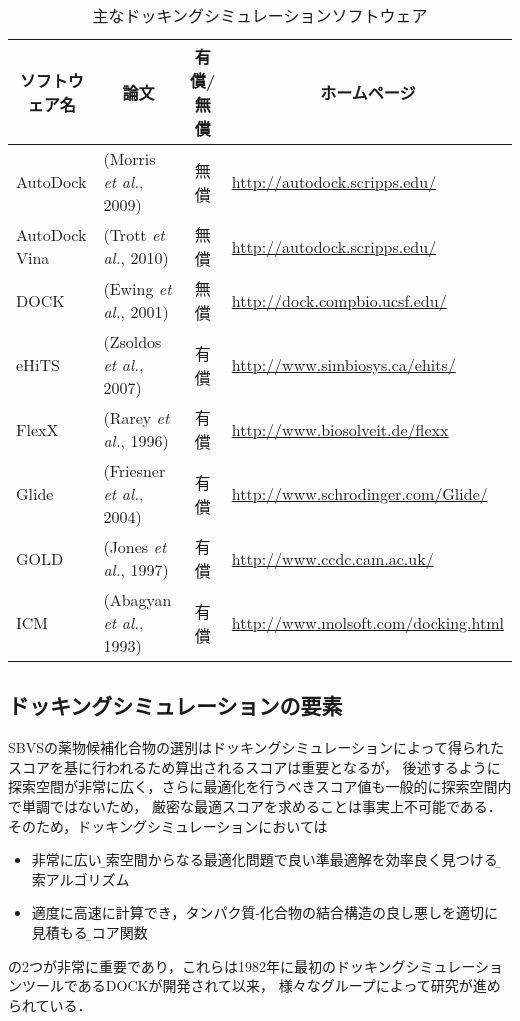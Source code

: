\begin{table}[htb] \centering
	\caption{主なドッキングシミュレーションソフトウェア}
	\label{table:docking_tools_eg}
	\begin{tabular}{llcl}
	\hline
	\multicolumn{1}{c}{ソフトウェア名}	&\multicolumn{1}{c}{論文}			&\multicolumn{1}{c}{有償/無償}	&\multicolumn{1}{c}{ホームページ}	\\ \hline
	AutoDock					&(Morris {\it et al.}, 2009)\cite{Morris2009}												&無償									&\url{http://autodock.scripps.edu/}	\\ 
	AutoDock Vina				&(Trott  {\it et al.}, 2010)\cite{Trott2010}																											&無償									&\url{http://autodock.scripps.edu/}	\\ 
	DOCK							&(Ewing {\it et al.}, 2001)\cite{Ewing2001}																				&無償									&\url{http://dock.compbio.ucsf.edu/}	\\
	eHiTS							&(Zsoldos {\it et al.}, 2007)\cite{Zsoldos2007}											&有償									&\url{http://www.simbiosys.ca/ehits/}	\\
	FlexX							&(Rarey {\it et al.}, 1996)\cite{Rarey1996}																											&有償									&\url{http://www.biosolveit.de/flexx}	\\
	Glide							&(Friesner {\it et al.}, 2004)\cite{Friesner2004}													&有償									&\url{http://www.schrodinger.com/Glide/}	\\
	GOLD							&(Jones {\it et al.}, 1997)\cite{Jones1997}																				&有償									&\url{http://www.ccdc.cam.ac.uk/}	\\
	ICM								&(Abagyan {\it et al.}, 1993)\cite{Abagyan1993}																											&有償									&\url{http://www.molsoft.com/docking.html}	\\ \hline
	\end{tabular}
\end{table}


\subsection{ドッキングシミュレーションの要素}\label{subsec:docking_elements}
SBVSの薬物候補化合物の選別はドッキングシミュレーションによって得られたスコアを基に行われるため算出されるスコアは重要となるが，
後述するように探索空間が非常に広く，さらに最適化を行うべきスコア値も一般的に探索空間内で単調ではないため，
厳密な最適スコアを求めることは事実上不可能である．そのため，ドッキングシミュレーションにおいては
\begin{itemize}
\item 非常に広い\b{探索空間}からなる最適化問題で良い準最適解を効率良く見つける\b{探索アルゴリズム}
\item 適度に高速に計算でき，タンパク質-化合物の結合構造の良し悪しを適切に見積もる\b{スコア関数}
\end{itemize}
の2つが非常に重要であり，これらは1982年に最初のドッキングシミュレーションツールであるDOCK\cite{Kuntz1982}が開発されて以来，
様々なグループによって研究が進められている．

